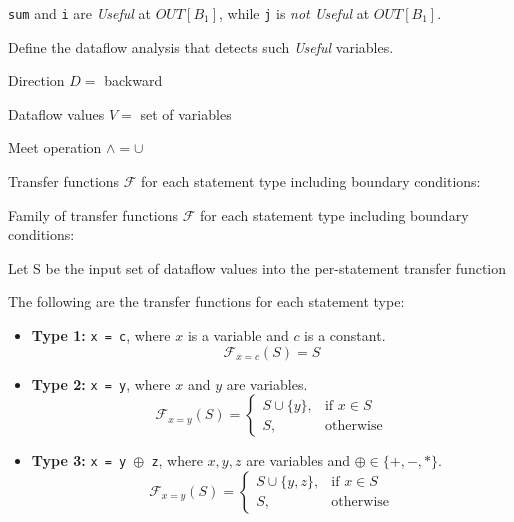 \documentclass[12pt]{article}
\begin{document}
\begin{enumerate}

        \lstinline$sum$ and \lstinline$i$ are \emph{Useful} at $OUT[B_1]$,
      while \lstinline$j$ is \emph{not Useful} at $OUT[B_1]$.


      Define the dataflow analysis that detects such \emph{Useful} variables.

      \begin{mdframed}
        Direction $D =$ backward

        Dataflow values $V = $ set of variables

        Meet operation $\wedge = \cup$

        Transfer functions $\mathcal{F}$ for each statement type including boundary conditions:  %

        Family of transfer functions $\mathcal{F}$ for each statement type
        including boundary conditions:

        Let S be the input set of dataflow values into the per-statement transfer function

        The following are the transfer functions for each statement type:

        \begin{itemize}

            \item \textbf{Type 1:} \texttt{x = c}, where $x$ is a variable and $c$ is a constant.
            \[
                \mathcal{F}_{x = c}(S) = S
            \]

            \item \textbf{Type 2:} \texttt{x = y}, where $x$ and $y$ are variables.
            \[
                \mathcal{F}_{x = y}(S) =
                \begin{cases}
                    S \cup \{y\}, & \text{if } x \in S \\
                    S, & \text{otherwise}
                \end{cases}
            \]

            \item \textbf{Type 3:} \texttt{x = y $\oplus$ z}, where $x, y, z$ are variables and $\oplus \in \{+, -, *\}$.
            \[
                \mathcal{F}_{x = y}(S) =
                \begin{cases}
                    S \cup \{y, z\}, & \text{if } x \in S \\
                    S, & \text{otherwise}
                \end{cases}
            \]


\end{itemize}
\end{mdframed}
\end{enumerate}
\end{document}
